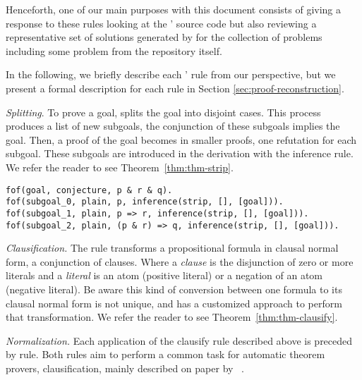 \documentclass[../main.tex]{subfiles}
\begin{document}
Henceforth, one of our main purposes with this document consists of
giving a response to these rules looking at the \Metis' source code but also reviewing a representative set of solutions generated by
\Metis for the \CPL collection of \TPTP problems~\cite{Prieto-Cubides2017} including some problem from the \Metis repository itself.

In the following, we briefly describe each \Metis' rule from our perspective, but we present a formal description for each rule in Section \ref{sec:proof-reconstruction}.

\vskip 2mm


\textit{Splitting}. To prove a goal, \Metis splits the goal into
disjoint cases. This process produces a list of new subgoals, the
conjunction of these subgoals implies the goal. Then, a proof of the
goal becomes in smaller proofs, one refutation for each subgoal.
These subgoals are introduced in the \TSTP derivation with the \strip
inference rule. We refer the reader to see Theorem~\ref{thm:thm-strip}.

\begin{verbatim}
fof(goal, conjecture, p & r & q).
fof(subgoal_0, plain, p, inference(strip, [], [goal])).
fof(subgoal_1, plain, p => r, inference(strip, [], [goal])).
fof(subgoal_2, plain, (p & r) => q, inference(strip, [], [goal])).
\end{verbatim}


\textit{Clausification.} The \clausify rule transforms a
propositional formula in clausal normal form, a conjunction
of clauses. Where a \emph{clause} is the disjunction of zero or more
literals and a \emph{literal} is an atom (positive literal) or a
negation of an atom (negative literal). Be aware this kind of conversion between one formula to its clausal normal form is not unique, and \Metis has a customized approach to perform that transformation. We refer the reader to see Theorem~\ref{thm:thm-clausify}.

\vskip 2mm


\textit{Normalization.}
Each application of the clausify rule described above is preceded by
\canonicalize rule. Both rules aim to perform a common task for
automatic theorem provers, clausification, mainly described on paper
by \citeauthor{Sutcliffe1996}~\cite{Sutcliffe1996}.
\end{document}
